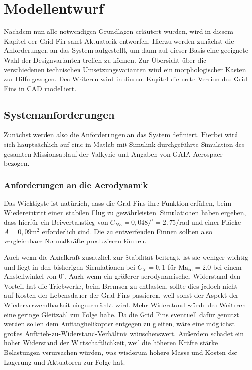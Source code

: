 \chapter{Modellentwurf}\label{sec:modellentwurf}
Nachdem nun alle notwendigen Grundlagen erläutert wurden, wird in diesem Kapitel der Grid Fin samt Aktuatorik entworfen. Hierzu werden zunächst die Anforderungen an das System aufgestellt, um dann auf dieser Basis eine geeignete Wahl der Designvarianten treffen zu können. Zur Übersicht über die verschiedenen technischen Umsetzungsvarianten wird ein morphologischer Kasten zur Hilfe gezogen. Des Weiteren wird in diesem Kapitel die erste Version des Grid Fins in CAD modelliert.
\section{Systemanforderungen}
Zunächst werden also die Anforderungen an das System definiert. Hierbei wird sich hauptsächlich auf eine in Matlab mit Simulink durchgeführte Simulation des gesamten Missionsablauf der Valkyrie und Angaben von GAIA Aerospace bezogen.
\subsection{Anforderungen an die Aerodynamik}
Das Wichtigste ist natürlich, dass die Grid Fins ihre Funktion erfüllen, beim Wiedereintritt einen stabilen Flug zu gewährleisten. Simulationen haben ergeben, dass hierfür ein Beiwertanstieg von $C_{N\alpha} =0,048/^\circ=2,75/$rad und einer Fläche $A=0,09\mathrm{m}^2$ erforderlich sind. Die zu entwerfenden Finnen sollten also vergleichbare Normalkräfte produzieren können.

Auch wenn die Axialkraft zusätzlich zur Stabilität beiträgt, ist sie weniger wichtig und liegt in den bisherigen Simulationen bei $C_X=0,1$ für $\mathrm{Ma}_\infty=2.0$ bei einem Anstellwinkel von $0^\circ$. Auch wenn ein größerer aerodynamischer Widerstand den Vorteil hat die Triebwerke, beim Bremsen zu entlasten, sollte dies jedoch nicht auf Kosten der Lebensdauer der Grid Fins passieren, weil sonst der Aspekt der Wiederverwendbarkeit eingeschränkt wird. Mehr Widerstand würde des Weiteren eine geringe Gleitzahl zur Folge habe. Da die Grid Fins eventuell dafür genutzt werden sollen dem Auffanghelikopter entgegen zu gleiten, wäre eine möglichst großes Auftrieb-zu-Widerstand-Verhältnis wünschenswert. Außerdem schadet ein hoher Widerstand der Wirtschaftlichkeit, weil die höheren Kräfte stärke Belastungen verursachen würden, was wiederum hohere Masse und Kosten der Lagerung und Aktuatoren zur Folge hat.
